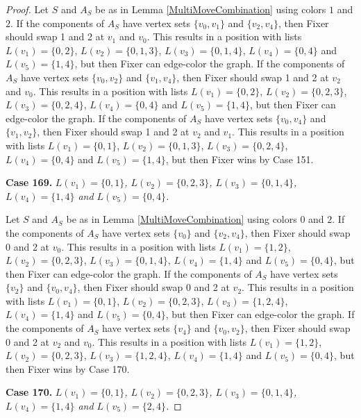 \documentclass[12pt]{amsart}
\theoremstyle{plain}
\theoremstyle{definition}
\theoremstyle{remark}
\begin{document}
\begin{proof}
Let $S$ and $A_S$ be as in Lemma \ref{MultiMoveCombination} using colors $1$ and $2$. If the components of $A_S$ have vertex sets $\{v_0, v_1\}$ and $\{v_2, v_4\}$, then Fixer should swap 1 and 2 at $v_1$ and $v_0$. This results in a position with lists $L(v_1) = \{0, 2\}$, $L(v_2) = \{0, 1, 3\}$, $L(v_3) = \{0, 1, 4\}$, $L(v_4) = \{0, 4\}$ and $L(v_5) = \{1, 4\}$, but then Fixer can edge-color the graph.
If the components of $A_S$ have vertex sets $\{v_0, v_2\}$ and $\{v_1, v_4\}$, then Fixer should swap 1 and 2 at $v_2$ and $v_0$. This results in a position with lists $L(v_1) = \{0, 2\}$, $L(v_2) = \{0, 2, 3\}$, $L(v_3) = \{0, 2, 4\}$, $L(v_4) = \{0, 4\}$ and $L(v_5) = \{1, 4\}$, but then Fixer can edge-color the graph.
If the components of $A_S$ have vertex sets $\{v_0, v_4\}$ and $\{v_1, v_2\}$, then Fixer should swap 1 and 2 at $v_2$ and $v_1$. This results in a position with lists $L(v_1) = \{0, 1\}$, $L(v_2) = \{0, 1, 3\}$, $L(v_3) = \{0, 2, 4\}$, $L(v_4) = \{0, 4\}$ and $L(v_5) = \{1, 4\}$, but then Fixer wins by Case 151.

\noindent\textbf{Case 169.  }\textit{$L(v_1) = \{0, 1\}$, $L(v_2) = \{0, 2, 3\}$, $L(v_3) = \{0, 1, 4\}$, $L(v_4) = \{1, 4\}$ and $L(v_5) = \{0, 4\}$.}

Let $S$ and $A_S$ be as in Lemma \ref{MultiMoveCombination} using colors $0$ and $2$. If the components of $A_S$ have vertex sets $\{v_0\}$ and $\{v_2, v_4\}$, then Fixer should swap 0 and 2 at $v_0$. This results in a position with lists $L(v_1) = \{1, 2\}$, $L(v_2) = \{0, 2, 3\}$, $L(v_3) = \{0, 1, 4\}$, $L(v_4) = \{1, 4\}$ and $L(v_5) = \{0, 4\}$, but then Fixer can edge-color the graph.
If the components of $A_S$ have vertex sets $\{v_2\}$ and $\{v_0, v_4\}$, then Fixer should swap 0 and 2 at $v_2$. This results in a position with lists $L(v_1) = \{0, 1\}$, $L(v_2) = \{0, 2, 3\}$, $L(v_3) = \{1, 2, 4\}$, $L(v_4) = \{1, 4\}$ and $L(v_5) = \{0, 4\}$, but then Fixer can edge-color the graph.
If the components of $A_S$ have vertex sets $\{v_4\}$ and $\{v_0, v_2\}$, then Fixer should swap 0 and 2 at $v_2$ and $v_0$. This results in a position with lists $L(v_1) = \{1, 2\}$, $L(v_2) = \{0, 2, 3\}$, $L(v_3) = \{1, 2, 4\}$, $L(v_4) = \{1, 4\}$ and $L(v_5) = \{0, 4\}$, but then Fixer wins by Case 170.

\noindent\textbf{Case 170.  }\textit{$L(v_1) = \{0, 1\}$, $L(v_2) = \{0, 2, 3\}$, $L(v_3) = \{0, 1, 4\}$, $L(v_4) = \{1, 4\}$ and $L(v_5) = \{2, 4\}$.}


\end{proof}
\end{document}
